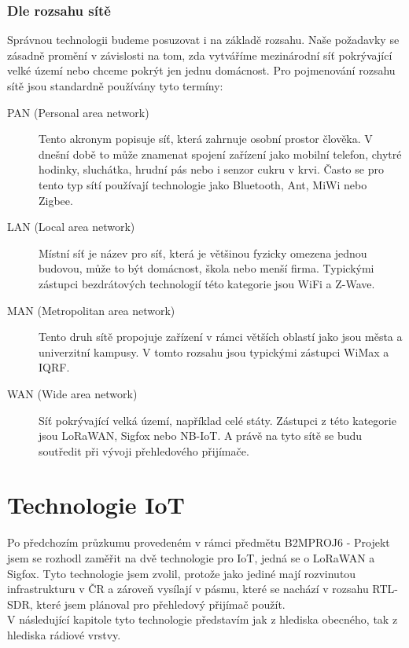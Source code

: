 \documentclass{ctuthesis}
\begin{document}
\subsection{Dle rozsahu sítě}
Správnou technologii budeme posuzovat i na základě rozsahu. Naše požadavky se zásadně promění v závislosti na tom, zda vytváříme mezinárodní síť pokrývající velké území nebo chceme pokrýt jen jednu domácnost. Pro pojmenování rozsahu sítě jsou standardně používány tyto termíny:
\begin{description}
\item [PAN (Personal area network)]
Tento akronym popisuje síť, která zahrnuje osobní prostor člověka. V dnešní době to může znamenat spojení zařízení jako mobilní telefon, chytré hodinky, sluchátka, hrudní pás nebo i senzor cukru v krvi. Často se pro tento typ sítí používají technologie jako Bluetooth, Ant, MiWi nebo Zigbee.

\item [LAN (Local area network)]
Místní síť je název pro síť, která je většinou fyzicky omezena jednou budovou, může to být domácnost, škola nebo menší firma. Typickými zástupci bezdrátových technologií této kategorie jsou WiFi a Z-Wave.

\item [MAN (Metropolitan area network)]
Tento druh sítě propojuje zařízení v rámci větších oblastí jako jsou města a univerzitní kampusy. V tomto rozsahu jsou typickými zástupci WiMax a IQRF.

\item [WAN (Wide area network)]
Síť pokrývající velká území, například celé státy. Zástupci z této kategorie jsou LoRaWAN, Sigfox nebo NB-IoT. A právě na tyto sítě se budu soutředit při vývoji přehledového přijímače.
\end{description}
\cite{ja}

\chapter{Technologie IoT}
Po předchozím průzkumu provedeném v rámci předmětu B2MPROJ6 - Projekt jsem se rozhodl zaměřit na dvě technologie pro IoT, jedná se o LoRaWAN a Sigfox. Tyto technologie jsem zvolil, protože jako jediné mají rozvinutou infrastrukturu v ČR a zároveň vysílají v pásmu, které se nachází v rozsahu RTL-SDR, které jsem plánoval pro přehledový přijímač použít.\\
V následující kapitole tyto technologie představím jak z hlediska obecného, tak z hlediska rádiové vrstvy.
\end{document}
